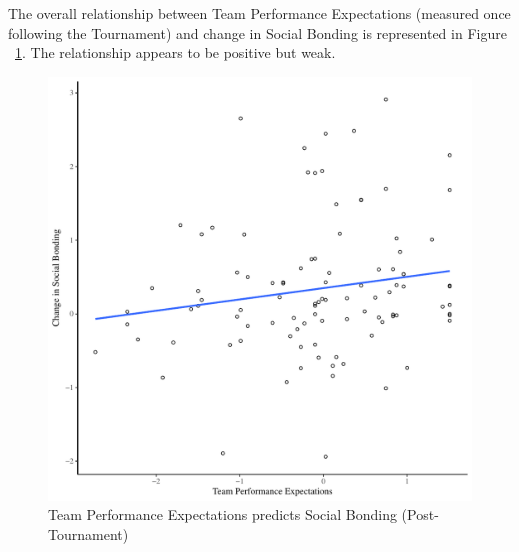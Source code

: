 \begin{CJK}{UTF8}{gbsn}
The overall relationship between Team Performance Expectations (measured once following the Tournament) and change in Social Bonding is represented in Figure ~\ref{fig:teamPerfBondDeltaBasicXY}.  The relationship appears to be positive but weak.

    \begin{figure}[htbp]
      \centering
    \includegraphics[scale=.5]{images/teamPerfBondDeltaBasicXY.pdf}
      \caption{Team Performance Expectations predicts Social Bonding (Post-Tournament)}
      \label{fig:teamPerfBondDeltaBasicXY}
    \end{figure}


\end{CJK}
